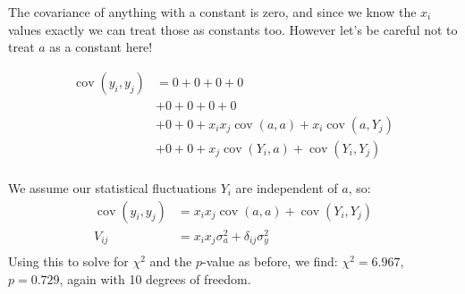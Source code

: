 \begin{enumerate}[label=\textbf{\Alph*}.]
    The covariance of anything with a constant is zero, and since we know the $x_i$ values exactly we can treat those as constants too. However let's be careful not to treat $a$ as a constant here!

    \begin{align*}
        \operatorname{cov}(y_i, y_j) &= 0
         + 0
         + 0
         + 0 \\
        &+ 0
         + 0
         + 0
         + 0 \\
        &+ 0
         + 0
         + x_ix_j\operatorname{cov}(a, a)
         + x_i\operatorname{cov}(a, Y_j) \\
        &+ 0
         + 0
         + x_j\operatorname{cov}(Y_i, a)
         + \operatorname{cov}(Y_i, Y_j) \\
    \end{align*}

    We assume our statistical fluctuations $Y_i$ are independent of $a$, so:
    \begin{align*}
        \operatorname{cov}(y_i, y_j) &= x_ix_j\operatorname{cov}(a, a) + \operatorname{cov}(Y_i, Y_j) \\
        V_{ij} &= x_ix_j\sigma_a^2 + \delta_{ij}\sigma_y^2 \\
    \end{align*}
    Using this to solve for $\chi^2$ and the $p$-value as before, we find: $\chi^2=6.967$, $p=0.729$, again with 10 degrees of freedom.

\end{enumerate}
